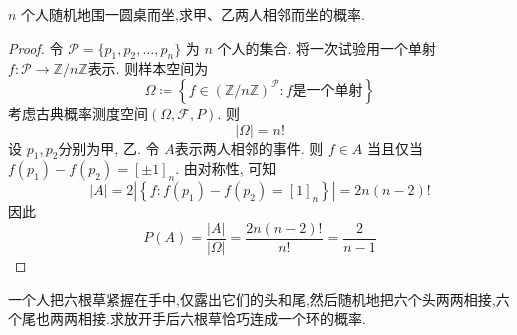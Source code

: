 \documentclass[../main.tex]{subfiles}
\begin{document}
\begin{exercise}{}{}
$n$ 个人随机地围一圆桌而坐,求甲、乙两人相邻而坐的概率.
\end{exercise}

\begin{proof}
  令 $\mathcal{P} = \{p_1, p_2, \dots, p_n\}$ 为 $n$ 个人的集合. 将一次试验用一个单射 \(  f: \mathcal{P}\to \mathbb{Z} /n\mathbb{Z}   \)表示. 则样本空间为 \[
   \Omega \coloneqq \left\{ f \in \left( \mathbb{Z} /n\mathbb{Z}  \right)^{\mathcal{P}}: f\text{是一个单射}  \right\}
  \]考虑古典概率测度空间\(  \left(  \Omega , \mathcal{F},P \right)   \). 则 \[
  \left|  \Omega  \right|=  n! 
  \]设 \(  p_1,p_2  \)分别为甲, 乙.  令 \(  A  \)表示两人相邻的事件. 则 \(  f \in A  \) 当且仅当  \(  f\left( p_1 \right)-f\left( p_2 \right)  = [\pm 1]_{n}  \). 由对称性, 可知 \[
  \left| A \right|= 2 \left| \left\{ f:f\left( p_1 \right)-f\left( p_2 \right)= [1]_{n}   \right\} \right|  = 2 n \left( n-2 \right) !
  \]因此 \[
  P\left( A \right)= \frac{\left| A \right|  }{\left|  \Omega  \right|  }=  \frac{2n\left( n-2 \right)!  }{n! }= \frac{2 }{n-1 }    
  \]  
\end{proof}

\begin{exercise}{}{}
一个人把六根草紧握在手中,仅露出它们的头和尾,然后随机地把六个头两两相接,六个尾也两两相接.求放开手后六根草恰巧连成一个环的概率. 
\end{exercise}
\end{document}
